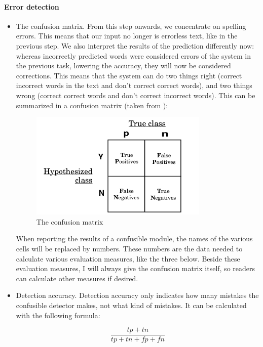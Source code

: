 \documentclass[12pt]{article}
\begin{document}
\paragraph{Error detection}

\begin{itemize}
\item The confusion matrix. From this step onwards, we concentrate on spelling errors. This means that our input no longer is errorless text, like in the previous step. We also interpret the results of the prediction differently now: whereas incorrectly predicted words were considered errors of the system in the previous task, lowering the accuracy, they will now be considered corrections. This means that the system can do two things right (correct incorrect words in the text and don't correct correct words), and two things wrong (correct correct words and don't correct incorrect words). This can be summarized in a confusion matrix (taken from \citet{fawcett04}):

\begin{figure}[htb]
\centering
\includegraphics[width=0.8\textwidth]{confusion_matrix.png}
\caption{The confusion matrix}
\label{fig:confusion}
\end{figure}

When reporting the results of a confusible module, the names of the various cells will be replaced by numbers. These numbers are the data needed to calculate various evaluation measures, like the three below. Beside these evaluation measures, I will always give the confusion matrix itself, so readers can calculate other measures if desired.

\item Detection accuracy. Detection accuracy only indicates how many mistakes the confusible detector makes, not what kind of mistakes. It can be calculated with the following formula:

\[
\frac{tp+tn}{tp+tn+fp+fn}
\]


\end{itemize}
\end{document}
